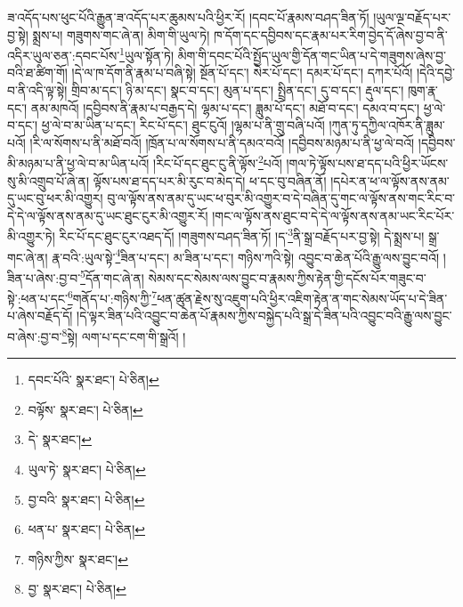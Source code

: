 ཟ་འདོད་པས་ཕུང་པོའི་རྒྱུན་ཟ་འདོད་པར་ཆུམས་པའི་ཕྱིར་རོ། །དབང་པོ་རྣམས་བཤད་ཟིན་ཏོ། །ཡུལ་ལྔ་བརྗོད་པར་བྱ་སྟེ། སྨྲས་པ། གཟུགས་གང་ཞེ་ན། མིག་གི་ཡུལ་ཏེ། ཁ་དོག་དང་དབྱིབས་དང་རྣམ་པར་རིག་བྱེད་དོ་ཞེས་བྱ་བ་ནི་འདིར་ཡུལ་ཅན་:དབང་པོས་\footnote{དབང་པོའི་  སྣར་ཐང་།  པེ་ཅིན། }ཡུལ་སྟོན་ཏེ། མིག་གི་དབང་པོའི་སྤྱོད་ཡུལ་གྱི་དོན་གང་ཡིན་པ་དེ་གཟུགས་ཞེས་བྱ་བའི་ཐ་ཚིག་གོ། །དེ་ལ་ཁ་དོག་ནི་རྣམ་པ་བཞི་སྟེ། སྔོན་པོ་དང་། སེར་པོ་དང་། དམར་པོ་དང་། དཀར་པོའོ། །དེའི་དབྱེ་བ་ནི་འདི་ལྟ་སྟེ། གྲིབ་མ་དང་། ཉི་མ་དང་། སྣང་བ་དང་། མུན་པ་དང་། སྤྲིན་དང་། དུ་བ་དང་། རྡུལ་དང་། ཁུག་རྣ་དང་། ནམ་མཁའོ། །དབྱིབས་ནི་རྣམ་པ་བརྒྱད་དེ། ལྷམ་པ་དང་། ཟླུམ་པོ་དང་། མཐོ་བ་དང་། དམའ་བ་དང་། ཕྱ་ལེ་བ་དང་། ཕྱ་ལེ་བ་མ་ཡིན་པ་དང་། རིང་པོ་དང་། ཐུང་ངུའོ། །ལྷམ་པ་ནི་གྲུ་བཞི་པའོ། །ཀུན་ཏུ་དཀྱིལ་འཁོར་ནི་ཟླུམ་པའོ། །རི་ལ་སོགས་པ་ནི་མཐོ་བའོ། །ཁྲོན་པ་ལ་སོགས་པ་ནི་དམའ་བའོ། །དབྱིབས་མཉམ་པ་ནི་ཕྱ་ལེ་བའོ། །དབྱིབས་མི་མཉམ་པ་ནི་ཕྱ་ལེ་བ་མ་ཡིན་པའོ། །རིང་པོ་དང་ཐུང་ངུ་ནི་ལྟོས་\footnote{བལྟོས་  སྣར་ཐང་།  པེ་ཅིན། }པའོ། །གལ་ཏེ་ལྟོས་པས་ཐ་དད་པའི་ཕྱིར་ཡོངས་སུ་མི་འགྲུབ་པོ་ཞེ་ན། ལྟོས་པས་ཐ་དད་པར་མི་རུང་བ་མེད་དེ། ཕ་དང་བུ་བཞིན་ནོ། །དཔེར་ན་ཕ་ལ་ལྟོས་ནས་ནམ་དུ་ཡང་བུ་ཕར་མི་འགྱུར། བུ་ལ་ལྟོས་ནས་ནམ་དུ་ཡང་ཕ་བུར་མི་འགྱུར་བ་དེ་བཞིན་དུ་གང་ལ་ལྟོས་ནས་གང་རིང་བ་དེ་དེ་ལ་ལྟོས་ནས་ནམ་དུ་ཡང་ཐུང་ངུར་མི་འགྱུར་རོ། །གང་ལ་ལྟོས་ནས་ཐུང་བ་དེ་དེ་ལ་ལྟོས་ནས་ནམ་ཡང་རིང་པོར་མི་འགྱུར་ཏེ། རིང་པོ་དང་ཐུང་ངུར་འཐད་དོ། །གཟུགས་བཤད་ཟིན་ཏོ། །ད་\footnote{དེ་  སྣར་ཐང་། }ནི་སྒྲ་བརྗོད་པར་བྱ་སྟེ། དེ་སྨྲས་པ། སྒྲ་གང་ཞེ་ན། རྣ་བའི་:ཡུལ་སྟེ་\footnote{ཡུལ་ཏེ་  སྣར་ཐང་།  པེ་ཅིན། }ཟིན་པ་དང་། མ་ཟིན་པ་དང་། གཉིས་ཀའི་སྟེ། འབྱུང་བ་ཆེན་པོའི་རྒྱུ་ལས་བྱུང་བའོ། །ཟིན་པ་ཞེས་:བྱ་བ་\footnote{བྱ་བའི་  སྣར་ཐང་།  པེ་ཅིན། }དོན་གང་ཞེ་ན། སེམས་དང་སེམས་ལས་བྱུང་བ་རྣམས་ཀྱིས་རྟེན་གྱི་དངོས་པོར་གཟུང་བ་སྟེ་:ཕན་པ་དང་\footnote{ཕན་པ་  སྣར་ཐང་།  པེ་ཅིན། }གནོད་པ་:གཉིས་ཀྱི་\footnote{གཉིས་ཀྱིས་  སྣར་ཐང་། }ཕན་ཚུན་རྗེས་སུ་འཇུག་པའི་ཕྱིར་འཇིག་རྟེན་ན་གང་སེམས་ཡོད་པ་དེ་ཟིན་པ་ཞེས་བརྗོད་དོ། །དེ་ལྟར་ཟིན་པའི་འབྱུང་བ་ཆེན་པོ་རྣམས་ཀྱིས་བསྐྱེད་པའི་སྒྲ་དེ་ཟིན་པའི་འབྱུང་བའི་རྒྱུ་ལས་བྱུང་བ་ཞེས་:བྱ་བ་\footnote{བྱ་  སྣར་ཐང་།  པེ་ཅིན། }སྟེ། ལག་པ་དང་ངག་གི་སྒྲའོ། །
